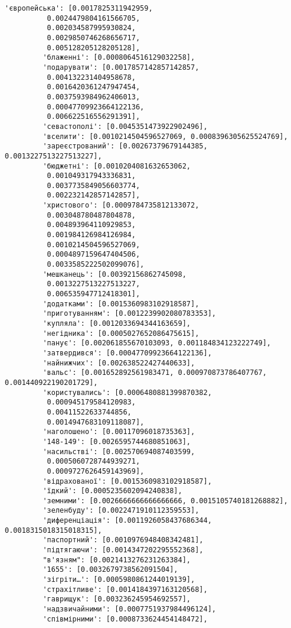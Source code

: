 \documentclass[11pt]{article}
\begin{document}
\begin{Verbatim}[commandchars=\\\{\}]
         'європейська': [0.0017825311942959,
          0.0024479804161566705,
          0.002034587995930824,
          0.0029850746268656717,
          0.005128205128205128],
         'блаженні': [0.0008064516129032258],
         'подарувати': [0.0017857142857142857,
          0.004132231404958678,
          0.0016420361247947454,
          0.0037593984962406013,
          0.00047709923664122136,
          0.006622516556291391],
         'севастополі': [0.0045351473922902496],
         'вселити': [0.0010214504596527069, 0.0008396305625524769],
         'зареєстрований': [0.00267379679144385, 0.0013227513227513227],
         'бюджетні': [0.0010204081632653062,
          0.001049317943336831,
          0.0037735849056603774,
          0.002232142857142857],
         'христового': [0.0009784735812133072,
          0.003048780487804878,
          0.004893964110929853,
          0.001984126984126984,
          0.0010214504596527069,
          0.0004897159647404506,
          0.0033585222502099076],
         'мешканець': [0.00392156862745098,
          0.0013227513227513227,
          0.006535947712418301],
         'додатками': [0.0015360983102918587],
         'приготуванням': [0.0012239902080783353],
         'купляла': [0.0012033694344163659],
         'негідника': [0.0005027652086475615],
         'панує': [0.002061855670103093, 0.001184834123222749],
         'затвердився': [0.00047709923664122136],
         'найнижчих': [0.002638522427440633],
         'вальс': [0.001652892561983471, 0.000970873786407767, 0.001440922190201729],
         'користувались': [0.0006480881399870382,
          0.000945179584120983,
          0.00411522633744856,
          0.0014947683109118087],
         'наголошено': [0.00117096018735363],
         '148-149': [0.0026595744680851063],
         'насильстві': [0.002570694087403599,
          0.0005060728744939271,
          0.0009727626459143969],
         'відрахованої': [0.0015360983102918587],
         'їдкий': [0.0005235602094240838],
         'земними': [0.0026666666666666666, 0.0015105740181268882],
         'зеленбуду': [0.0022471910112359553],
         'диференціація': [0.0011926058437686344, 0.0018315018315018315],
         'паспортний': [0.0010976948408342481],
         'підтягаючи': [0.0014347202295552368],
         "в'язням": [0.0021413276231263384],
         '1655': [0.0032679738562091504],
         'зігріти…': [0.0005980861244019139],
         'страхітливе': [0.0014184397163120568],
         'гаврищук': [0.003236245954692557],
         'надзвичайними': [0.0007751937984496124],
         'співмірними': [0.0008733624454148472],

\end{Verbatim}
\end{document}
